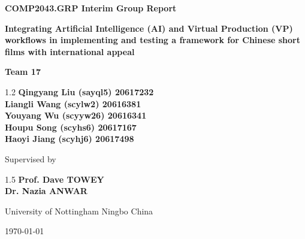 \documentclass[12pt,a4paper]{report}
\begin{document}
\begin{titlepage}
    \centering
    \vspace*{2cm}
    
    
    {\large\bfseries COMP2043.GRP Interim Group Report\par}
    \vspace{1.5cm}
    
    {\Large \textbf{Integrating Artificial Intelligence (AI) and Virtual Production (VP) workflows in implementing and testing a framework for Chinese short films with international appeal}\par}
    \vspace{1cm}
    
    {\Large \textbf{Team 17}\par}
    \vspace{0.4cm}
    
    \begin{spacing}{1.2}
    \large\textbf{Qingyang Liu (sayql5) 20617232} \\
    \large\textbf{Liangli Wang (scylw2) 20616381} \\
    \large\textbf{Youyang Wu (scyyw26) 20616341} \\
    \large\textbf{Houpu Song (scyhs6) 20617167} \\
    \large\textbf{Haoyi Jiang (scyhj6) 20617498} \\
    \end{spacing}
    \vspace{1cm}
    
    {\Large Supervised by\par}
    \begin{spacing}{1.5}
    \large\textbf{Prof. Dave TOWEY} \\
    \large\textbf{Dr. Nazia ANWAR} \\
    \end{spacing}
    
    \vfill
    {\large University of Nottingham Ningbo China \par}
    \vspace{0.15cm}
    {\large \today\par}
\end{titlepage}
\end{document}
